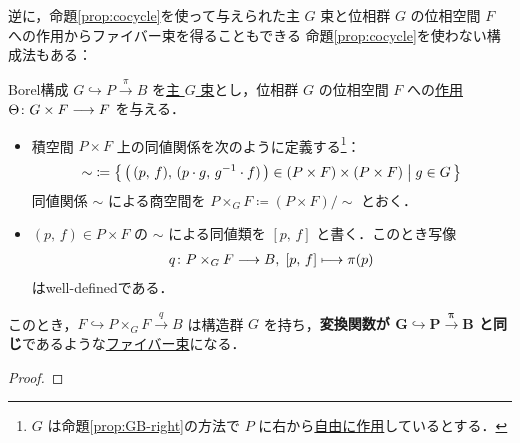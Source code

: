 \documentclass[algtopo_main]{subfiles}
\begin{document}
逆に，命題\ref{prop:cocycle}を使って与えられた主 $G$ 束と位相群 $G$ の位相空間 $F$ への作用からファイバー束を得ることもできる
命題\ref{prop:cocycle}を使わない構成法もある：
\begin{myprop}[label=prop:Borel-const, breakable]{Borel構成}
    $G \hookrightarrow P \xrightarrow{\pi} B$ を\hyperref[def:GB]{主 $G$ 束}とし，位相群 $G$ の位相空間 $F$ への\hyperref[def:TG-action]{作用} $\Theta \colon G \times F \longrightarrow F$ を与える．
    \begin{itemize}
        \item 
        積空間 $P \times F$ 上の同値関係を次のように定義する\footnote{$G$ は命題\ref{prop:GB-right}の方法で $P$ に右から\hyperref[def:TG-action]{自由に作用}しているとする．}：
        \begin{align}
            \sim \; \coloneqq \bigl\{\, \bigl(\,(p,\, f),\, (p \cdot g,\, g^{-1} \cdot f)\,\bigr) \in (P \times F) \times (P \times F)\bigm| g \in G \,\bigr\} 
        \end{align}
        同値関係 $\sim$ による商空間を $P \times_G F \coloneqq (P\times F)/{\sim}$ とおく．
        \item $(p,\, f) \in P \times F$ の $\sim$ による同値類を $[p,\, f]$ と書く．このとき写像
        \begin{align}
            q \colon P \times_G F \longrightarrow B,\; [p,\, f] \longmapsto \pi(p)
        \end{align}
        はwell-definedである．
    \end{itemize}
    このとき，$F \hookrightarrow P \times_G F \xrightarrow{q} B$ は構造群 $G$ を持ち，\textbf{変換関数が $\bm{G \hookrightarrow P \xrightarrow{\pi} B}$ と同じ}であるような\hyperref[def:FB]{ファイバー束}になる．
\end{myprop}

\begin{proof}
    
\end{proof}

\end{document}
